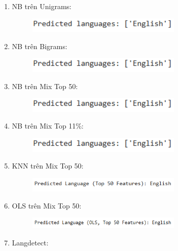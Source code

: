 \begin{enumerate}
    \item NB trên Unigrams:
    \begin{figure}[H]
    \centering
    \includegraphics[width=0.7\textwidth]{img/docspics/Picture62.png}
\end{figure}
    \item NB trên Bigrams:
    \begin{figure}[H]
    \centering
    \includegraphics[width=0.7\textwidth]{img/docspics/Picture63.png}
\end{figure}
    \item NB trên Mix Top 50:
    \begin{figure}[H]
    \centering
    \includegraphics[width=0.7\textwidth]{img/docspics/Picture64.png}
\end{figure}
    \item NB trên Mix Top 11\%:
    \begin{figure}[H]
    \centering
    \includegraphics[width=0.7\textwidth]{img/docspics/Picture65.png}
\end{figure}
    \item KNN trên Mix Top 50:
    \begin{figure}[H]
    \centering
    \includegraphics[width=0.7\textwidth]{img/docspics/Picture66.png}
\end{figure}
    \item OLS trên Mix Top 50:
    \begin{figure}[H]
    \centering
    \includegraphics[width=0.7\textwidth]{img/docspics/Picture67.png}
\end{figure}
    \item Langdetect:

\end{enumerate}
